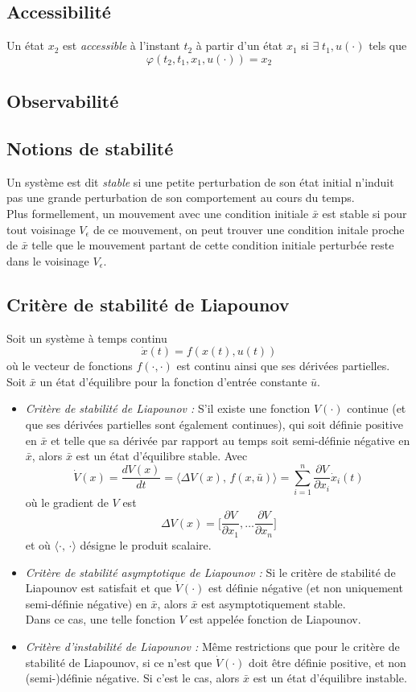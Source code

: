 \documentclass[a4paper]{article}
\begin{document}
\subsection{Accessibilité}
Un état $x_2$ est \emph{accessible} à l'instant $t_2$ à partir d'un état $x_1$
si $\exists\;t_1, u(\cdot)$ tels que \[\varphi(t_2,t_1,x_1,u(\cdot))=x_2\]
\subsection{Observabilité}
\subsection{Notions de stabilité}
Un système est dit  \emph{stable} si une petite perturbation de son état initial
n'induit pas une grande perturbation de son comportement au cours du temps.\\
Plus formellement, un mouvement avec une condition initiale $\bar x$ est
stable si pour tout voisinage $V_\epsilon$ de ce mouvement, on peut trouver
une condition initale proche de $\bar x$ telle que le mouvement partant de
cette condition initiale perturbée reste dans le voisinage $V_\epsilon$.
\subsection{Critère de stabilité de Liapounov}
Soit un système à temps continu
\[\dot x(t)=f(x(t),u(t))\]
où le vecteur de fonctions $f(\cdot, \cdot)$ est continu ainsi que ses
dérivées partielles.\\
Soit $\bar x$ un état d'équilibre pour la fonction d'entrée constante $\bar u$.
\begin{itemize}
	\item \emph{Critère de stabilité de Liapounov :} S'il existe une fonction
		$V(\cdot)$ continue (et que ses dérivées partielles sont également
		continues), qui soit définie positive en $\bar x$ et telle que sa
		dérivée par rapport au temps soit semi-définie négative en $\bar x$,
		alors $\bar x$ est un état d'équilibre stable.
		Avec
		\[
			\dot V(x)=\frac{dV(x)}{dt}
			=\langle\Delta V(x),\,f(x,\bar u)\rangle
			=\sum_{i=1}^{n}\frac{\partial V}{\partial x_i}\dot x_i(t)\]
		où le gradient de \(V\) est
		\[\Delta V(x)=\big[\frac{\partial V}{\partial x_1},\dots
		\frac{\partial V}{\partial x_n}\big]\]
		et où \(\langle\cdot,\,\cdot\rangle\) désigne le produit scalaire.
	\item \emph{Critère de stabilité asymptotique de Liapounov :}
		Si le critère de stabilité de Liapounov est satisfait et que
		$\dot V(\cdot)$ est définie négative (et non uniquement semi-définie
		négative) en $\bar x$, alors $\bar x$ est asymptotiquement stable.\\
		Dans ce cas, une telle fonction \(V\) est appelée fonction de Liapounov.
	\item \emph{Critère d'instabilité de Liapounov :} Même restrictions
		que pour le critère de stabilité de Liapounov, si ce n'est que
		$\dot V(\cdot)$ doit être définie positive, et non
		(semi-)définie négative. Si c'est le cas, alors \(\bar x\) est
		un état d'équilibre instable.
\end{itemize}
\end{document}
